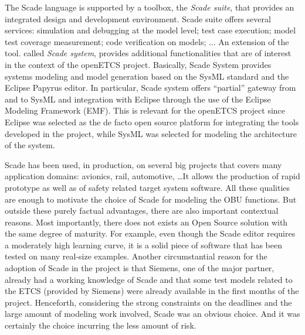 \documentclass{template/openetcs_report}
\begin{document}
The Scade language is supported by a toolbox, the \emph{Scade suite},
that provides an integrated design and development environment. Scade
suite offers several services: simulation and debugging at the model
level; test case execution; model test coverage measurement; code
verification on models; ... An extension of the tool. called
\emph{Scade system}, provides additional functionalities that are of
interest in the context of the openETCS project. Basically, Scade
System provides systems modeling and model generation based on the
SysML standard and the Eclipse Papyrus editor. In particular, Scade
system offers ``partial'' gateway from and to SysML and integration
with Eclipse through the use of the Eclipse Modeling Framework
(EMF). This is relevant for the openETCS project since Eclipse was
selected as the de facto open source platform for integrating the
tools developed in the project, while SysML was selected for modeling
the architecture of the system.


Scade has been used, in production, on several big projects that
covers many application domains: avionics, rail, automotive, \dots It
allows the production of rapid prototype as well as of safety related
target system software. All these qualities are enough to motivate the
choice of Scade for modeling the OBU functions. But outside these
purely factual advantages, there are also important contextual
reasons. Most importantly, there does not exists an Open Source
solution with the same degree of maturity. For example, even though
the Scade editor requires a moderately high learning curve, it is a
solid piece of software that has been tested on many real-size
examples. Another circumstantial reason for the adoption of Scade in
the project is that Siemens, one of the major partner, already had a
working knowledge of Scade and that some test models related to the
ETCS (provided by Siemens) were already available in the first months
of the project. Henceforth, considering the strong constraints on the
deadlines and the large amount of modeling work involved, Scade was an
obvious choice. And it was certainly the choice incurring the less
amount of risk.
\end{document}
